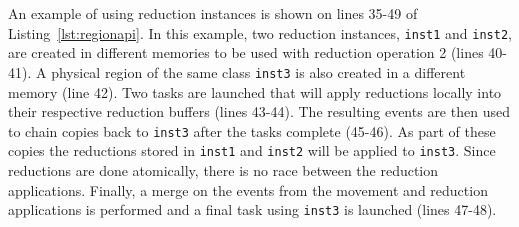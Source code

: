 
An example of using reduction instances is shown on lines 35-49 of Listing~\ref{lst:regionapi}.
In this example, two reduction instances, {\tt inst1} and {\tt inst2}, are created in different memories to
be used with reduction operation 2 (lines 40-41).  A physical region of the same class {\tt inst3}
is also created in a different memory (line 42).  Two tasks are launched that will apply
reductions locally into their respective reduction buffers (lines 43-44).  The resulting
events are then used to chain copies back to {\tt inst3} after the tasks complete (45-46).  As
part of these copies the reductions stored in {\tt inst1} and {\tt inst2} will be applied
to {\tt inst3}.  Since reductions are done atomically, there is no race between the reduction
applications.  Finally, a merge on the events from the movement and reduction applications is 
performed and a final task using {\tt inst3} is launched (lines 47-48).


